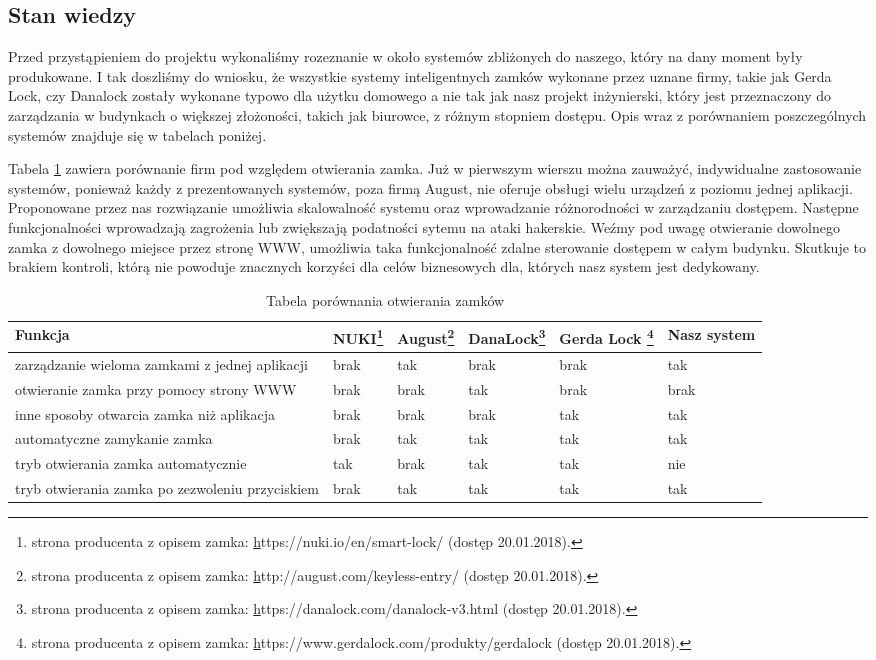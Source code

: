 \newpage
\subsection{Stan wiedzy}
Przed przystąpieniem do projektu wykonaliśmy rozeznanie w około systemów zbliżonych do naszego, który na dany moment były produkowane. I tak doszliśmy do wniosku, że wszystkie systemy inteligentnych zamków wykonane przez uznane firmy, takie jak Gerda Lock, czy Danalock zostały wykonane typowo dla użytku domowego a nie tak jak nasz projekt inżynierski, który jest przeznaczony do zarządzania w budynkach o większej złożoności, takich jak biurowce, z różnym stopniem dostępu. Opis wraz z porównaniem poszczególnych systemów znajduje się w tabelach poniżej.

Tabela \ref{tab:porownanie1} zawiera porównanie firm pod względem otwierania zamka. Już w pierwszym wierszu można zauważyć, indywidualne zastosowanie systemów, ponieważ każdy z prezentowanych systemów, poza firmą August, nie oferuje obsługi wielu urządzeń z poziomu jednej aplikacji. Proponowane przez nas rozwiązanie umożliwia skalowalność systemu oraz wprowadzanie różnorodności w zarządzaniu dostępem. Następne funkcjonalności wprowadzają zagrożenia lub zwiększają podatności sytemu na ataki hakerskie. Weźmy pod uwagę otwieranie dowolnego zamka z dowolnego miejsce przez stronę WWW, umożliwia taka funkcjonalność zdalne sterowanie dostępem w całym budynku. Skutkuje to brakiem kontroli, którą nie powoduje znacznych korzyści dla celów biznesowych dla, których nasz system jest dedykowany.
	\begin{longtable}[!ht]{|m{4cm}|m{1cm}|m{1cm}|m{}|m{1cm}|m{}|} 
		\caption{Tabela porównania otwierania zamków}
		\label{tab:porownanie1}\\
		\hline	
		Funkcja & NUKI\footnote{strona producenta z opisem zamka: \hyperref[strona internetowa Nuki]https://nuki.io/en/smart-lock/ (dostęp 20.01.2018).} & August\footnote{strona producenta z opisem zamka: \hyperref[strona internetowa august]http://august.com/keyless-entry/ (dostęp 20.01.2018).} & DanaLock\footnote{strona producenta z opisem zamka: \hyperref[strona internetowa DanaLock]https://danalock.com/danalock-v3.html (dostęp 20.01.2018).} &
		 Gerda Lock \footnote{strona producenta z opisem zamka: \hyperref[strona internetowa Gerda Lock]https://www.gerdalock.com/produkty/gerdalock (dostęp 20.01.2018).} & 
		 Nasz system  \\	\hline
		 zarządzanie wieloma zamkami z jednej aplikacji
		 & brak & tak & brak & brak & tak \\	\hline
		otwieranie zamka przy pomocy strony WWW
		& brak & brak & tak & brak & brak \\	\hline
		inne sposoby otwarcia zamka niż aplikacja
		& brak & brak & brak & tak & tak \\	\hline
		automatyczne zamykanie zamka
		& brak & tak & tak & tak & tak \\	\hline
		tryb otwierania zamka automatycznie
		& tak& brak & tak & tak & nie \\	\hline	
		tryb otwierania zamka po zezwoleniu przyciskiem
		& brak & tak & tak & tak & tak \\		\hline
	\end{longtable}

